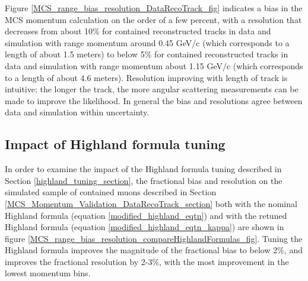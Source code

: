 \documentclass[a4paper,11pt]{article}
\begin{document}
Figure \ref{MCS_range_bias_resolution_DataRecoTrack_fig} indicates a bias in the MCS momentum calculation on the order of a few percent, with a resolution that decreases from about 10\% for contained reconstructed tracks in data and simulation with range momentum around 0.45 GeV/c (which corresponds to a length of about 1.5 meters) to below 5\% for contained reconstructed tracks in data and simulation with range momentum about 1.15 GeV/c (which corresponds to a length of about 4.6 meters). Resolution improving with length of track is intuitive; the longer the track, the more angular scattering measurements can be made to improve the likelihood. In general the bias and resolutions agree between data and simulation within uncertainty.\\

\subsection{Impact of Highland formula tuning}\label{highland_formula_tuning_impact_section}

In order to examine the impact of the Highland formula tuning described in Section \ref{highland_tuning_section}, the fractional bias and resolution on the simulated sample of contained muons described in Section \ref{MCS_Momentum_Validation_DataRecoTrack_section} both with the nominal Highland formula (equation \ref{modified_highland_eqtn}) and with the retuned Highland formula (equation \ref{modified_highland_eqtn_kappa}) are shown in figure \ref{MCS_range_bias_resolution_compareHighlandFormulas_fig}. Tuning the Highland formula improves the magnitude of the fractional bias to below 2\%, and improves the fractional resolution by 2-3\%, with the most improvement in the lowest momentum bins.
\end{document}
